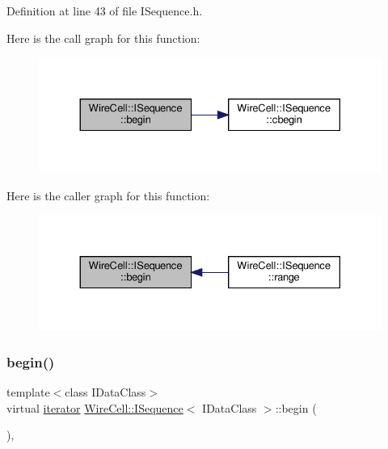 Definition at line 43 of file I\+Sequence.\+h.

Here is the call graph for this function\+:
\nopagebreak
\begin{figure}[H]
\begin{center}
\leavevmode
\includegraphics[width=330pt]{class_wire_cell_1_1_i_sequence_a38e93257d35e23239456ff47ffd6f172_cgraph}
\end{center}
\end{figure}
Here is the caller graph for this function\+:
\nopagebreak
\begin{figure}[H]
\begin{center}
\leavevmode
\includegraphics[width=330pt]{class_wire_cell_1_1_i_sequence_a38e93257d35e23239456ff47ffd6f172_icgraph}
\end{center}
\end{figure}
\mbox{\label{class_wire_cell_1_1_i_sequence_a03153c2cdc4d34c0feca9b214d4ed2a8}} 
\subsubsection{\texorpdfstring{begin()}{begin()}\hspace{0.1cm}{\footnotesize\ttfamily [2/2]}}
{\footnotesize\ttfamily template$<$class I\+Data\+Class$>$ \\
virtual \hyperlink{class_wire_cell_1_1_i_sequence_ac9bcf643972944d21c90743d9281f47a}{iterator} \hyperlink{class_wire_cell_1_1_i_sequence}{Wire\+Cell\+::\+I\+Sequence}$<$ I\+Data\+Class $>$\+::begin (\begin{DoxyParamCaption}{ }\end{DoxyParamCaption})\hspace{0.3cm}{\ttfamily [inline]}, {\ttfamily [virtual]}}



